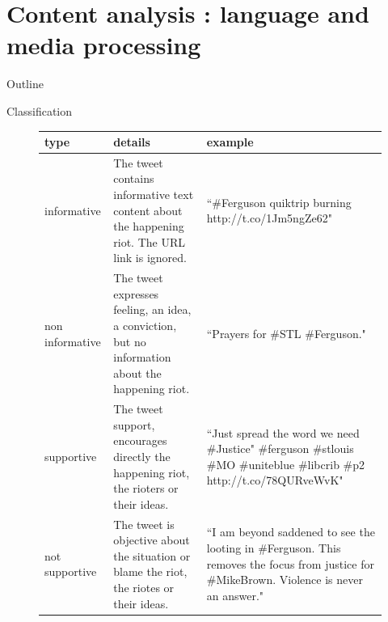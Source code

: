 \documentclass[first=dblue,second=red,logo=blueexc]{aaltoslides}
\begin{document}

\section{Content analysis : language and media processing}
\begin{frame}{Outline}
\tableofcontents[sectionstyle=show/shaded]
\end{frame}

\begin{frame}{Classification}


\begin{figure}[h!]
\centering
\scriptsize
\begin{tabular}{l|m{4cm}|m{4cm}}
type & details & example\\
\hline
\hline
informative & The tweet contains informative text content about the happening riot. The URL link is ignored. & ``\#Ferguson quiktrip burning http://t.co/1Jm5ngZe62" \\
\hline
non informative & The tweet expresses feeling, an idea, a conviction, but no information about the happening riot. & ``Prayers for \#STL \#Ferguson." \\
\hline
\hline
supportive & The tweet support, encourages directly the happening riot, the rioters or their ideas. & ``Just spread the word we need \#Justice" \#ferguson \#stlouis \#MO  \#uniteblue \#libcrib \#p2 http://t.co/78QURveWvK" \\
\hline
not supportive & The tweet is objective about the situation or blame the riot, the riotes or their ideas. & ``I am beyond saddened to see the looting in \#Ferguson. This removes the focus from justice for \#MikeBrown. Violence is never an answer." \\
\end{tabular}
\end{figure}


\end{frame}

\end{document}
